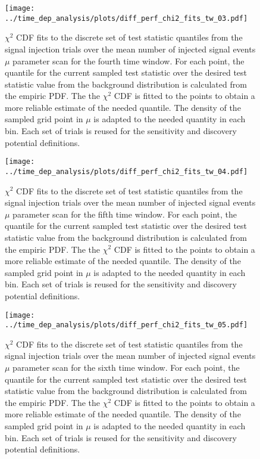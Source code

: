 \begin{figure}[H]
  \centering
  \texttt{[image: ../time\_dep\_analysis/plots/diff\_perf\_chi2\_fits\_tw\_03.pdf]}
  \caption[$\chi^2$ CDF fits for the 4th time window differential performance]{
     $\chi^2$ CDF fits to the discrete set of test statistic quantiles from the signal injection trials over the mean number of injected signal events $\mu$ parameter scan for the fourth time window.
     For each point, the quantile for the current sampled test statistic over the desired test statistic value from the background distribution is calculated from the empiric PDF.
     The the $\chi^2$ CDF is fitted to the points to obtain a more reliable estimate of the needed quantile.
     The density of the sampled grid point in $\mu$ is adapted to the needed quantity in each bin.
     Each set of trials is reused for the sensitivity and discovery potential definitions.
  }
  \label{fig:diff_perf_chi2_fits_tw_03}
\end{figure}
\begin{figure}[H]
  \centering
  \texttt{[image: ../time\_dep\_analysis/plots/diff\_perf\_chi2\_fits\_tw\_04.pdf]}
  \caption[$\chi^2$ CDF fits for the 5th time window differential performance]{
     $\chi^2$ CDF fits to the discrete set of test statistic quantiles from the signal injection trials over the mean number of injected signal events $\mu$ parameter scan for the fifth time window.
     For each point, the quantile for the current sampled test statistic over the desired test statistic value from the background distribution is calculated from the empiric PDF.
     The the $\chi^2$ CDF is fitted to the points to obtain a more reliable estimate of the needed quantile.
     The density of the sampled grid point in $\mu$ is adapted to the needed quantity in each bin.
     Each set of trials is reused for the sensitivity and discovery potential definitions.
  }
  \label{fig:diff_perf_chi2_fits_tw_04}
\end{figure}
\begin{figure}[H]
  \centering
  \texttt{[image: ../time\_dep\_analysis/plots/diff\_perf\_chi2\_fits\_tw\_05.pdf]}
  \caption[$\chi^2$ CDF fits for the 6th time window differential performance]{
     $\chi^2$ CDF fits to the discrete set of test statistic quantiles from the signal injection trials over the mean number of injected signal events $\mu$ parameter scan for the sixth time window.
     For each point, the quantile for the current sampled test statistic over the desired test statistic value from the background distribution is calculated from the empiric PDF.
     The the $\chi^2$ CDF is fitted to the points to obtain a more reliable estimate of the needed quantile.
     The density of the sampled grid point in $\mu$ is adapted to the needed quantity in each bin.
     Each set of trials is reused for the sensitivity and discovery potential definitions.
  }
  \label{fig:diff_perf_chi2_fits_tw_05}
\end{figure}

